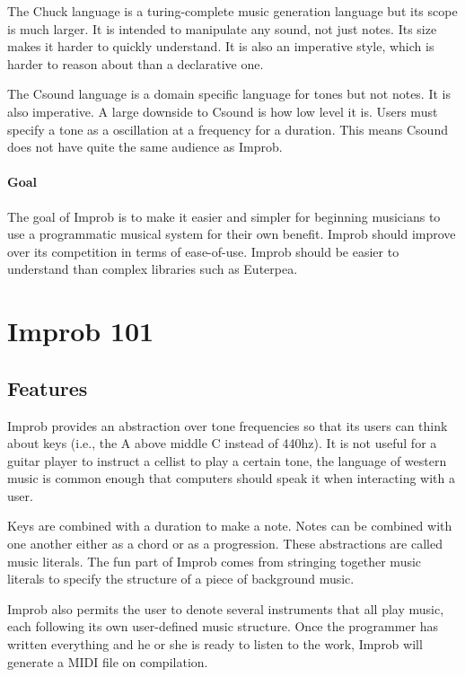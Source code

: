 \documentclass{sigplanconf-pldi15}
\begin{document}
The Chuck language is a turing-complete music generation language but its scope is much larger. It is intended to manipulate any sound, not just notes. Its size makes it harder to quickly understand. It is also an imperative style, which is harder to reason about than a declarative one.

The Csound language is a domain specific language for tones but not notes. It is also imperative. A large downside to Csound is how low level it is. Users must specify a tone as a oscillation at a frequency for a duration. This means Csound does not have quite the same audience as Improb.

\paragraph{Goal}
The goal of Improb is to make it easier and simpler for beginning musicians to use a programmatic musical system for their own benefit. Improb should improve over its competition in terms of ease-of-use. Improb should be easier to understand than complex libraries such as Euterpea.

\section{Improb 101}
\subsection{Features}
Improb provides an abstraction over tone frequencies so that its users can think about keys (i.e., the A above middle C instead of 440hz). It is not useful for a guitar player to instruct a cellist to play a certain tone, the language of western music is common enough that computers should speak it when interacting with a user.

Keys are combined with a duration to make a note. Notes can be combined with one another either as a chord or as a progression. These abstractions are called music literals. The fun part of Improb comes from stringing together music literals to specify the structure of a piece of background music.

Improb also permits the user to denote several instruments that all play music, each following its own user-defined music structure. Once the programmer has written everything and he or she is ready to listen to the work, Improb will generate a MIDI file on compilation.
\end{document}
